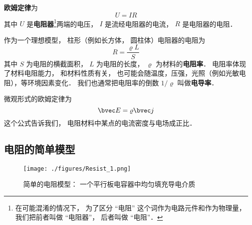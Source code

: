 

\textbf{欧姆定律}为
\begin{equation}
U = IR
\end{equation}
其中 $U$ 是\textbf{电阻器}\footnote{在可能混淆的情况下， 为了区分 “电阻” 这个词作为电路元件和作为物理量， 我们把前者叫做 “电阻器”， 后者叫做 “电阻”．}两端的电压， $I$ 是流经电阻器的电流， $R$ 是电阻器的电阻．

作为一个理想模型， 柱形（例如长方体， 圆柱体）电阻器的电阻为
\begin{equation}
R = \frac{\varrho L}{S}
\end{equation}
其中 $S$ 为电阻的横截面积， $L$ 为电阻的长度， $\varrho$ 为材料的\textbf{电阻率}． 电阻率体现了材料电阻能力， 和材料性质有关， 也可能会随温度，压强，光照（例如光敏电阻），等环境因素变化． 我们也通常把电阻率的倒数 $1/\varrho$ 叫做\textbf{电导率}．

微观形式的欧姆定律为
\begin{equation}
\bvec E = \varrho\bvec j
\end{equation}
这个公式告诉我们， 电阻材料中某点的电流密度与电场成正比．

\subsection{电阻的简单模型}
\begin{figure}[ht]
\centering
\texttt{[image: ./figures/Resist\_1.png]}
\caption{简单的电阻模型： 一个平行板电容器中均匀填充导电介质} \label{Resist_fig1}
\end{figure}

